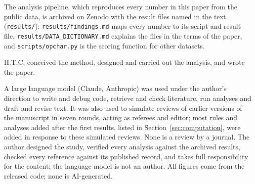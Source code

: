 \documentclass[pdflatex,sn-basic,lineno]{sn-jnl}
\begin{document}
The analysis pipeline, which reproduces every number in this paper from the public data, is archived on Zenodo \citep{canseven2026archive} with the result files named in the text (\texttt{results/}); \texttt{results/findings.md} maps every number to its script and result file, \texttt{results/DATA\_DICTIONARY.md} explains the files in the terms of the paper, and \texttt{scripts/opchar.py} is the scoring function for other datasets.

H.T.C. conceived the method, designed and carried out the analysis, and wrote the paper.

A large language model (Claude, Anthropic) was used under the author's direction to write and debug code, retrieve and check literature, run analyses and draft and revise text. It was also used to simulate reviews of earlier versions of the manuscript in seven rounds, acting as referees and editor; most rules and analyses added after the first results, listed in Section~\ref{sec:computation}, were added in response to these simulated reviews. None is a review by a journal. The author designed the study, verified every analysis against the archived results, checked every reference against its published record, and takes full responsibility for the content; the language model is not an author. All figures come from the released code; none is AI-generated.


\FloatBarrier
{\small
}
\end{document}
